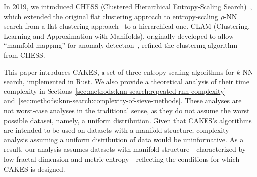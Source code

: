 In 2019, we introduced CHESS (Clustered Hierarchical Entropy-Scaling Search)~\cite{ishaq2019clustered}, which extended the original flat clustering approach to entropy-scaling $\rho$-NN search from a flat clustering approach~\cite{yu2015entropy} to a hierarchical one.
CLAM (Clustering, Learning and Approximation with Manifolds), originally developed to allow ``manifold mapping'' for anomaly detection~\cite{ishaq2021clustered}, refined the clustering algorithm from CHESS.


This paper introduces CAKES, a set of three entropy-scaling algorithms for $k$-NN search, implemented in Rust. We also provide a theoretical analysis of their time complexity in Sections~\ref{sec:methods:knn-search:repeated-rnn-complexity} and~\ref{sec:methods:knn-search:complexity-of-sieve-methods}.
These analyses are not worst-case analyses in the traditional sense, as they do not assume the worst possible dataset, namely, a uniform distribution.
Given that CAKES's algorithms are intended to be used on datasets with a manifold structure, complexity analysis assuming a uniform distribution of data would be uninformative.
As a result, our analysis assumes datasets with manifold structure—characterized by low fractal dimension and metric entropy—reflecting the conditions for which CAKES is designed.

